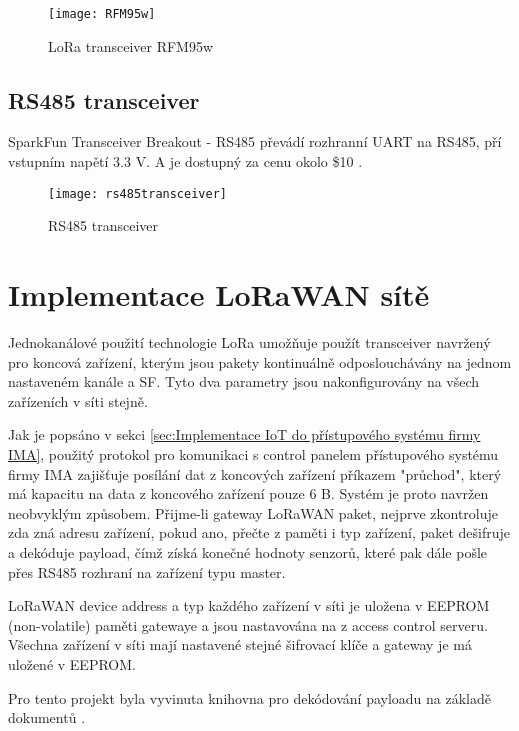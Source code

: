 \begin{figure}[!h]
    \centering
    \texttt{[image: RFM95w]}
    \caption{LoRa transceiver RFM95w \cite{RFM95w}}
    \label{fig:02}
\end{figure}

\subsection{RS485 transceiver}
SparkFun Transceiver Breakout - RS485 převádí rozhranní UART na RS485, pří vstupním napětí 3.3 V. A je dostupný za cenu okolo \$10 \cite{rs485tr}.

\begin{figure}[!h]
    \centering
    \texttt{[image: rs485transceiver]}
    \caption{RS485 transceiver \cite{rs485tr}}
    \label{fig:rs485transceiver}
\end{figure}

\newpage
\section{Implementace LoRaWAN sítě}
Jednokanálové použití technologie LoRa umožňuje použít transceiver navržený pro koncová zařízení, 
kterým jsou pakety kontinuálně odposlouchávány na jednom nastaveném kanále a SF. 
Tyto dva parametry jsou nakonfigurovány na všech zařízeních v síti stejně.

Jak je popsáno v sekci \ref{sec:Implementace IoT do přístupového systému firmy IMA}, 
použitý protokol pro komunikaci s control panelem přístupového systému firmy IMA zajišťuje posílání dat z koncových zařízení příkazem "průchod", 
který má kapacitu na data z koncového zařízení pouze 6 B. 
Systém je proto navržen neobvyklým způsobem. 
Přijme-li gateway LoRaWAN paket, nejprve zkontroluje zda zná adresu zařízení, pokud ano, přečte z paměti i typ zařízení,
 paket dešifruje a dekóduje payload, čímž získá konečné hodnoty senzorů, které pak dále pošle přes RS485 rozhraní na zařízení typu master.

LoRaWAN device address a typ každého zařízení v síti je uložena v EEPROM (non-volatile) paměti gatewaye a jsou nastavována na z access control serveru.
Všechna zařízení v síti mají nastavené stejné šifrovací klíče a gateway je má uložené v EEPROM.

Pro tento projekt byla vyvinuta knihovna pro dekódování payloadu na základě dokumentů \cite{lwSpec} \cite{lwSecur}.


